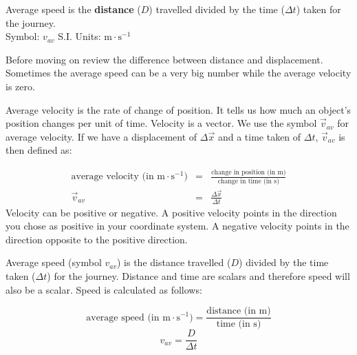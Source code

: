  {Average speed is the \textbf{distance} ($D$) travelled divided by the time ($\Delta t$) taken for the journey.\\
Symbol: $v_{av}$\hspace{2cm} S.I. Units: $\text{m}\cdot \text{s}^{-1}$} 



Before moving on review the difference between distance and displacement. Sometimes the average speed can be a very big number while the average velocity is zero.


      \label{m38791*id64258}Average velocity is the rate of change of position. It tells us how much an object's position changes per unit of  time. Velocity is a vector. We use the symbol $\vec{v}_{av}$ for average velocity. If we have a displacement of $\Delta \vec{x}$ and a time taken of $\Delta t$, $\vec{v}_{av}$ is then defined as:\par 
      \label{m38791*id64307}\nopagebreak\noindent{}
\begin{eqnarray*}
\text{average velocity (in m} \cdot \text{s}^{-1}) &=& \frac{\text{change in position (in m)}}{\text{change in time (in s)}}\\
\vec{v}_{av} &=& \frac{\Delta \vec{x}}{\Delta t}
\end{eqnarray*}\label{eq:pr:velocity}
      \label{m38791*id64460}Velocity can be positive or negative. A positive velocity points in the direction you chose as positive in your coordinate system. A negative velocity points in the direction opposite to the positive direction.

Average speed (symbol $v_{av}$) is the distance travelled ($D$) divided by the time taken ($\Delta t$) for the journey. Distance and time are scalars and therefore speed will also be a scalar. Speed is calculated as follows:\par 
      \label{m38791*id64549}\nopagebreak\noindent{}
        
    \begin{equation*}
    \text{average speed (in m} \cdot {\text{s}}^{-1}\text{)}  =  \frac{\text{distance (in m)}}{\text{time (in s)}} 
      \end{equation*}
      \label{m38791*id64639}\nopagebreak\noindent{}
    \begin{equation*}
    v_{av}=\frac{D}{\Delta t}
      \end{equation*}
      
